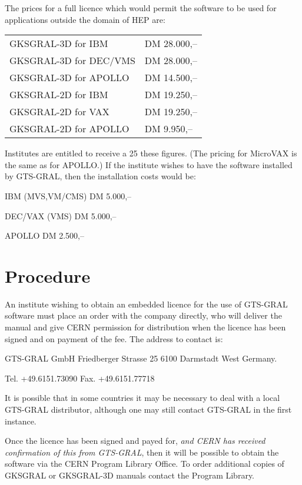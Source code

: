 The prices for a full licence which would permit the software to be used
for applications outside the domain of HEP are:
 
\begin{center}
\begin{tabular}{ll}
GKSGRAL-3D for IBM & DM 28.000,--\\
GKSGRAL-3D for DEC/VMS & DM 28.000,--\\
GKSGRAL-3D for APOLLO & DM 14.500,--\\
GKSGRAL-2D for IBM & DM 19.250,--\\
GKSGRAL-2D for VAX & DM 19.250,--\\
GKSGRAL-2D for APOLLO & DM 9.950,--\\
\end{tabular}
\end{center}
 
Institutes are entitled to receive a 25%
these figures. (The pricing for MicroVAX is the same as for APOLLO.)
If the institute wishes to have the software installed by GTS-GRAL,
then the installation costs would be:
\begin{OL}
\item IBM (MVS,VM/CMS) DM 5.000,--
\item DEC/VAX (VMS) DM 5.000,--
\item APOLLO DM 2.500,--
\end{OL}
\section{Procedure}
 
An institute wishing to obtain an embedded licence for the use
of GTS-GRAL software must place an order with the company directly,
who will deliver the manual and give CERN permission for distribution
when the licence has been signed and on payment of the fee.
The address to contact is:
\begin{XMP}
GTS-GRAL GmbH
Friedberger Strasse 25
6100 Darmstadt
West Germany.
 
Tel. +49.6151.73090
Fax. +49.6151.77718
\end{XMP}
It is possible that in some countries it may be necessary to deal with
a local GTS-GRAL distributor, although one may still contact GTS-GRAL in the
first instance.
 
Once the licence has been signed and payed for, {\it and CERN has received
confirmation of this from GTS-GRAL}, then it will be possible to
obtain the software via the CERN Program Library Office.
To order additional copies of GKSGRAL or GKSGRAL-3D manuals
contact the Program Library.
 
